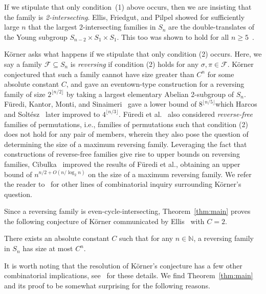 \documentclass[12pt]{article}
\begin{document}
If we stipulate that only condition~(1) above occurs, then
we are insisting that the family is \emph{2-intersecting}. Ellis, Friedgut, and Pilpel showed for 
sufficiently large $n$ that the largest 2-intersecting families in $S_n$ are the double-translates of the Young subgroup $S_{n-2} \times S_1 \times S_1$. This too was shown to hold for all $n \geq 5$~\cite{MeagherR21,2perm}. 


K\"orner asks what happens if we stipulate that only condition (2) occurs. Here, we say a family $\mathcal{F} \subseteq S_n$ is \emph{reversing}  if condition (2) holds for any $\sigma, \pi \in \mathcal{F}$. K\"orner conjectured that such a family cannot have size greater than $C^n$ for some absolute constant $C$, and gave an eventown-type construction for a reversing family of size $2^{\lfloor n/2 \rfloor}$ by taking a largest elementary Abelian 2-subgroup of $S_n$. F\"{u}redi, Kantor, Monti, and Sinaimeri~\cite{FurediKMS10,FurediKMS11} gave a lower bound of $8^{\lfloor n/5\rfloor}$which Harcos and Solt\'esz~\cite{HarcosS20} later improved to $4^{\lfloor n/3 \rfloor}$. F\"{u}redi et al.~\cite{FurediKMS10,FurediKMS11} also considered \emph{reverse-free} families of permutations, i.e., families of permutations such that condition (2) does not hold for any pair of members, wherein they also pose the question of determining the size of a maximum reversing family. Leveraging the fact that constructions of reverse-free families give rise to upper bounds on reversing families, Cibulka~\cite{Cibulka13} improved the results of F\"{u}redi et al., obtaining an upper bound of $n^{n/2 + O(n/\log_2 n)}$ on the size of a maximum reversing family. 
We refer the reader to~\cite{HarcosS20,CohenFK19,ByrneT24} for other lines of combinatorial inquiry surrounding K\"orner's question.

Since a reversing family is even-cycle-intersecting, Theorem~\ref{thm:main} proves the following conjecture of K\"orner communicated by Ellis~\cite{ellis2019,Ellis11} with $C = 2$.
\begin{theorem}\label{con:korner}\emph{\cite[Conjecture~4]{Ellis11}}
There exists an absolute constant $C$ such that for any $n \in \mathbb{N}$, a reversing family in $S_n$ has size at most $C^n$.
\end{theorem}
\noindent It is worth noting that the resolution of K\"orner's conjecture has a few other combinatorial implications, see~\cite[\S 5]{HarcosS20} for these details. We find Theorem~\ref{thm:main} and its proof to be somewhat surprising for the following reasons. 
\end{document}
